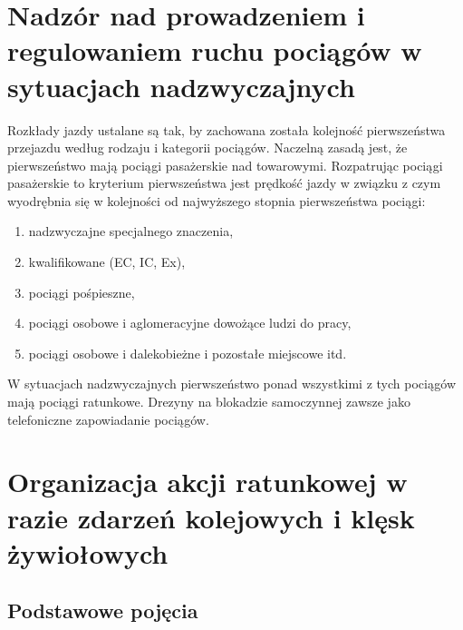 \chapter{Nadzór nad prowadzeniem i regulowaniem ruchu pociągów w sytuacjach nadzwyczajnych}

Rozkłady jazdy ustalane są tak, by zachowana została kolejność pierwszeństwa przejazdu według rodzaju i kategorii pociągów. 
Naczelną zasadą jest, że pierwszeństwo mają pociągi pasażerskie nad towarowymi. Rozpatrując pociągi pasażerskie to kryterium pierwszeństwa jest prędkość jazdy w związku z czym wyodrębnia się w kolejności od najwyższego stopnia pierwszeństwa pociągi: 
\begin{enumerate}
	\item nadzwyczajne specjalnego znaczenia, 
	\item kwalifikowane (EC, IC, Ex),
	\item pociągi pośpieszne,
	\item pociągi osobowe i aglomeracyjne dowożące ludzi do pracy, 
	\item pociągi osobowe i dalekobieżne i pozostałe miejscowe itd. 
\end{enumerate}
W sytuacjach nadzwyczajnych pierwszeństwo ponad wszystkimi z tych pociągów mają pociągi ratunkowe. Drezyny na blokadzie samoczynnej zawsze jako telefoniczne zapowiadanie pociągów. 

\chapter{Organizacja akcji ratunkowej w razie zdarzeń kolejowych i klęsk żywiołowych}

\section{Podstawowe pojęcia}

